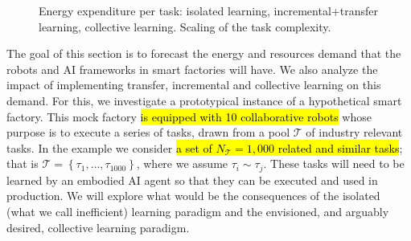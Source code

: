 \begin{figure}[!h]
	\hfill    
	\hspace*{\fill}    
	\caption[] {\label{fig:use_case_results} Energy expenditure per task:  isolated learning,  incremental+transfer learning,   collective learning.  Scaling of the task complexity.}
\end{figure}
The goal of this section is to forecast the energy and resources demand that the robots and AI frameworks in smart factories will have. We also analyze the impact of implementing transfer, incremental and collective learning on this demand. For this, we investigate a prototypical instance of a hypothetical smart factory. This mock factory \hl{is equipped with 10 collaborative robots} whose purpose is to execute a series of tasks, drawn from a pool $ \mathcal{T} $ of industry relevant tasks. In the example we consider \hl{a set of $N_{\mathcal{T}}=1,000$ related and similar tasks}; that is $ \mathcal{T}=\left\lbrace \tau_1,\ldots, \tau_{1000} \right\rbrace$, where we assume $ \tau_i \sim \tau_j $. These tasks will need to be learned by an embodied AI agent so that they can be executed and used in production. We will explore what would be the consequences of the isolated (what we call inefficient) learning paradigm and the envisioned, and arguably desired, collective learning paradigm.


